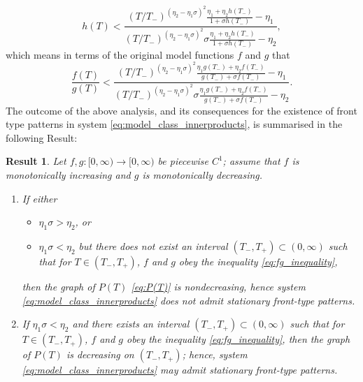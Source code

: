 \documentclass[a4paper,10pt,abstract=true,parskip=true]{scrartcl}
\newtheorem{res}[thm]{Result}
\theoremstyle{remark}
\numberwithin{equation}{section}
\numberwithin{thm}{section}
\begin{document}
\begin{displaymath}
    h(T) < \frac{(T/T_-)^{(\eta_2-\eta_1 \sigma)^2} \frac{\eta_1 + \eta_2 h(T_-)}{1+\sigma h(T_-)}-\eta_1}{(T/T_-)^{(\eta_2-\eta_1 \sigma)^2} \sigma\frac{\eta_1 + \eta_2 h(T_-)}{1+\sigma h(T_-)}-\eta_2},
\end{displaymath}
which means in terms of the original model functions $f$ and $g$ that
\begin{equation}\label{eq:fg_inequality}
    \frac{f(T)}{g(T)} < \frac{(T/T_-)^{(\eta_2-\eta_1 \sigma)^2} \frac{\eta_1 g(T_-) + \eta_2 f(T_-)}{g(T_-)+\sigma f(T_-)}-\eta_1}{(T/T_-)^{(\eta_2-\eta_1 \sigma)^2} \sigma\frac{\eta_1 g(T_-) + \eta_2 f(T_-)}{g(T_-)+\sigma f(T_-)}-\eta_2}.
\end{equation}
The outcome of the above analysis, and its consequences for the existence of front type patterns in system \eqref{eq:model_class_innerproducts}, is summarised in the following Result:

\begin{res}\label{res:patterns_general_necessaryconditions} Let $f,g : [0,\infty) \to [0,\infty)$ be piecewise $C^1$; assume that $f$ is monotonically increasing and $g$ is monotonically decreasing.
\begin{enumerate}
    \item If either 
    \begin{itemize}
        \item $\eta_1\sigma > \eta_2$, or
        \item $\eta_1\sigma < \eta_2$ but there does not exist an interval $(T_-,T_+) \subset (0,\infty)$ such that for $T \in (T_-,T_+) $, $f$ and $g$ obey the inequality \eqref{eq:fg_inequality},
    \end{itemize}
    then the graph of $P(T)$ \eqref{eq:P(T)} is nondecreasing, hence system \eqref{eq:model_class_innerproducts} does \emph{not} admit stationary front-type patterns.
    \item If $\eta_1\sigma < \eta_2$ and there exists an interval $(T_-,T_+) \subset (0,\infty)$ such that for $T \in (T_-,T_+) $, $f$ and $g$ obey the inequality \eqref{eq:fg_inequality}, then the graph of $P(T)$ is decreasing on $(T_-,T_+)$; hence, system \eqref{eq:model_class_innerproducts} may admit stationary front-type patterns.
\end{enumerate}
    
\end{res}
\end{document}

